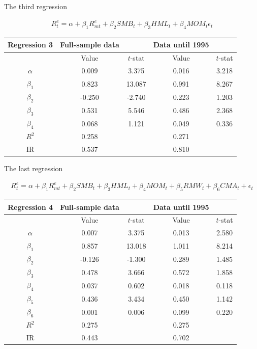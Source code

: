 \documentclass[10pt]{article}
\newenvironment{exercise}[2][Exercise]{\begin{trivlist}
  \item[\hskip \labelsep {\bfseries #1}\hskip \labelsep {\bfseries #2.}]}{\end{trivlist}}
\begin{document}
\begin{exercise}{3}
	The third regression
	
	\begin{align*}
		R_{t}^{e} = \alpha + \beta_{1}R^{e}_{mt} + \beta_{2}SMB_{t}+ \beta_{3}HML_{t} + \beta_{4}MOM_{t} \epsilon_{t} 
	\end{align*}

	\begin{table}[h!]
		\centering
 		\begin{tabular}{||c c c c c||} 
 			\hline
 			Regression 3 & Full-sample data & & Data until 1995 & \\ [0.5ex] 
 			\hline\hline
 		  	& Value & $t$-stat & Value & $t$-stat\\ [0.5ex] 
 			\hline\hline
 			$\alpha$ & 0.009 & 3.375 &  0.016 & 3.218\\ 
 			$\beta_{1}$ & 0.823 & 13.087 & 0.991 & 8.267\\
 			$\beta_{2}$ &  -0.250 & -2.740 & 0.223 & 1.203\\
 			$\beta_{3}$ &  0.531 & 5.546 & 0.486 & 2.368\\
 			$\beta_{4}$ & 0.068 & 1.121 & 0.049 & 0.336\\ [1ex]
 			\hline\hline
 			$R^{2}$ & 0.258 & & 0.271 &\\
 			IR & 0.537 & &  0.810 &\\ [1ex] 
 			\hline
		 \end{tabular}
	\end{table}
	
	The last regression
	
		\begin{align*}
		R_{t}^{e} = \alpha + \beta_{1}R^{e}_{mt} + \beta_{2}SMB_{t}+ \beta_{3}HML_{t} + \beta_{4}MOM_{t} + \beta_{5}RMW_{t} + \beta_{6}CMA_{t} + \epsilon_{t} 
	\end{align*}

	\begin{table}[h!]
		\centering
 		\begin{tabular}{||c c c c c||} 
 			\hline
 			Regression 4 & Full-sample data & & Data until 1995 & \\ [0.5ex] 
 			\hline\hline
 		  	& Value & $t$-stat & Value & $t$-stat\\ [0.5ex] 
 			\hline\hline
 			$\alpha$ & 0.007 & 3.375 & 0.013 &  2.580\\ 
 			$\beta_{1}$ & 0.857 & 13.018 & 1.011 & 8.214\\
 			$\beta_{2}$ &  -0.126 & -1.300 & 0.289 & 1.485\\
 			$\beta_{3}$ &  0.478 & 3.666 & 0.572 & 1.858\\
 			$\beta_{4}$ &  0.037 & 0.602 & 0.018 & 0.118\\
 			$\beta_{5}$ &  0.436 & 3.434 & 0.450 & 1.142\\
 			$\beta_{6}$ & 0.001 & 0.006 & 0.099 & 0.220\\ [1ex]
 			\hline\hline
 			$R^{2}$ & 0.275 & & 0.275 &\\
 			IR & 0.443 & & 0.702 &\\ [1ex] 
 			\hline
		 \end{tabular}
	\end{table}


\end{exercise}
\end{document}
